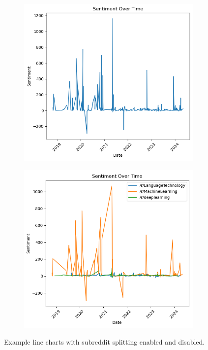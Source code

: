 \begin{figure}[h]
    \centering
    \begin{subfigure}{0.49\textwidth}
        \centering
        \includegraphics[width=\textwidth]{figures/line-chart.png}
    \end{subfigure}
    \begin{subfigure}{0.49\textwidth}
        \centering
        \includegraphics[width=\textwidth]{figures/split-line-chart.png}
    \end{subfigure}
    \caption{Example line charts with subreddit splitting enabled and disabled.}
\end{figure}

